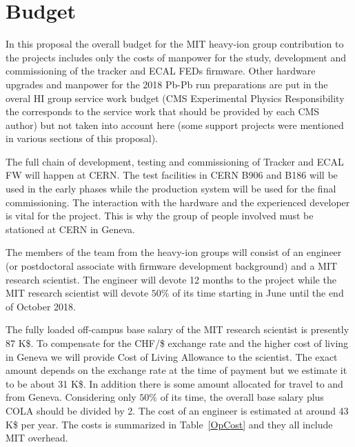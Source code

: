 \section{Budget}
\label{sec:funding}

In this proposal the overall budget for the MIT heavy-ion group contribution to the projects includes only the costs of manpower for the study, development and commissioning of the tracker and ECAL FEDs firmware. Other hardware upgrades and manpower for the 2018 Pb-Pb run preparations are put in the overal HI group service work budget (CMS Experimental Physics Responsibility the corresponds to the service work that should be provided by each CMS author)  but not taken into account here (some support projects were mentioned in various sections of this proposal).

The full chain of development, testing and commissioning of Tracker and ECAL FW will happen at CERN. The test facilities in CERN B906 and B186 will be used in the early phases while the production system will be used for the final commissioning. The interaction with the hardware and the experienced developer is vital for the project. This is why the group of people involved must be stationed at CERN in Geneva.

The members of the team from the heavy-ion groups will consist of an engineer (or postdoctoral associate with firmware development background)  and a MIT research scientist. The engineer will devote 12 months to the project while the MIT research scientist will devote $50\%$ of its time starting in June until the end of October 2018. 
 

The fully loaded off-campus base salary of the MIT research scientist is presently 87 K\$. To compensate for the CHF/\$ exchange rate and the higher cost of living in Geneva we will provide Cost of Living Allowance to the scientist. The exact amount depends on the exchange rate at the time of payment but we estimate it to be about 31 K\$. In addition there is some amount allocated for travel to and from Geneva. Considering only $50\%$ of its time, the overall base salary plus COLA should be divided by 2. The cost of an engineer is estimated at around 43 K\$ per year. The costs is summarized in Table~\ref{OpCost} and they all include MIT overhead. 

